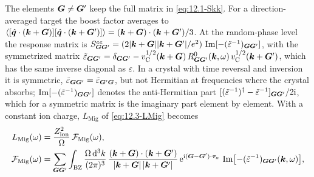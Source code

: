 The elements $\bm{G} \neq \bm{G}'$ keep the full matrix in \cref{eq:12.1-Skk}. For a direction-averaged target the boost factor averages to $\langle[\hat{\bm{q}}\cdot(\bm{k}+\bm{G})][\hat{\bm{q}}\cdot(\bm{k}+\bm{G}')]\rangle = (\bm{k}+\bm{G})\cdot(\bm{k}+\bm{G}')/3$. At the random-phase level the response matrix is $S^{ee}_{\bm{G}\bm{G}'} = (2|\bm{k}+\bm{G}||\bm{k}+\bm{G}'|/e^2)\,\operatorname{Im}[-(\tilde\varepsilon^{-1})_{\bm{G}\bm{G}'}]$, with the symmetrized matrix $\tilde\varepsilon_{\bm{G}\bm{G}'} = \delta_{\bm{G}\bm{G}'} - v_{\mathrm{C}}^{1/2}(\bm{k}+\bm{G})\,R^0_{\bm{G}\bm{G}'}(\bm{k},\omega)\,v_{\mathrm{C}}^{1/2}(\bm{k}+\bm{G}')$, which has the same inverse diagonal as $\varepsilon$. In a crystal with time reversal and inversion it is symmetric, $\tilde\varepsilon_{\bm{G}\bm{G}'} = \tilde\varepsilon_{\bm{G}'\bm{G}}$, but not Hermitian at frequencies where the crystal absorbs; $\operatorname{Im}[-(\tilde\varepsilon^{-1})_{\bm{G}\bm{G}'}]$ denotes the anti-Hermitian part $[(\tilde\varepsilon^{-1})^\dagger - \tilde\varepsilon^{-1}]_{\bm{G}\bm{G}'}/2\mathrm{i}$, which for a symmetric matrix is the imaginary part element by element. With a constant ion charge, $L_{\mathrm{Mig}}$ of \cref{eq:12.3-LMig} becomes
\begin{equation}
  \begin{aligned}
  L_{\mathrm{Mig}}(\omega) &= \frac{Z_{\mathrm{ion}}^2}{\Omega}\,\mathcal{F}_{\mathrm{Mig}}(\omega) , \\
  \mathcal{F}_{\mathrm{Mig}}(\omega) &= \sum_{\bm{G}\bm{G}'}\int_{\mathrm{BZ}}\frac{\Omega\,\mathrm{d}^3k}{(2\pi)^3}\,\frac{(\bm{k}+\bm{G})\cdot(\bm{k}+\bm{G}')}{|\bm{k}+\bm{G}|\,|\bm{k}+\bm{G}'|}\,\mathrm{e}^{\mathrm{i}(\bm{G}-\bm{G}')\cdot\bm{\tau}_\kappa}\,\operatorname{Im}\bigl[-(\tilde\varepsilon^{-1})_{\bm{G}\bm{G}'}(\bm{k},\omega)\bigr] ,
  \end{aligned}
  \label{eq:12.3-FL}
\end{equation}
